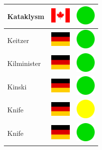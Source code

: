 \documentclass[12pt, a4paper, twoside]{report}
\begin{document}
\begin{center}
\begin{longtable}{|p{5cm}|p{2cm}|p{2cm}|}
 Kataklysm                                                  & \includegraphics[width=1cm]{4x3/ca} &   \includegraphics[width=1cm]{likes/y} \\ \hline
 Keitzer                                                    & \includegraphics[width=1cm]{4x3/de} &   \includegraphics[width=1cm]{likes/y} \\ \hline
 Kilminister                                                & \includegraphics[width=1cm]{4x3/de} &   \includegraphics[width=1cm]{likes/y} \\ \hline
 Kinski                                                     & \includegraphics[width=1cm]{4x3/de} &   \includegraphics[width=1cm]{likes/y} \\ \hline
 Knife                                                      & \includegraphics[width=1cm]{4x3/de} &   \includegraphics[width=1cm]{likes/m} \\ \hline
 Knife                                                      & \includegraphics[width=1cm]{4x3/de} &   \includegraphics[width=1cm]{likes/y} \\ \hline

\end{longtable}
\end{center}
\end{document}
